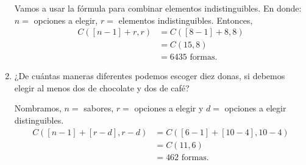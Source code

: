 \begin{enumerate}
\begin{center}
\begin{tikzpicture}[x=0.75pt,y=0.75pt,yscale=-1,xscale=1]
\end{tikzpicture}
    \end{center}
    \begin{solution}
    Vamos a usar la fórmula para combinar elementos indistinguibles. En donde: $n=$ opciones a elegir, $r=$ elementos indistinguibles. Entonces, 
    \begin{align*}
        C([n-1]+r,r) &= C([8-1]+8,8)\\
        &= C(15,8)\\
        &= 6435 \text{ formas.}
    \end{align*}
    \end{solution}
    \item ¿De cuántas maneras diferentes podemos escoger diez donas, si debemos elegir al menos dos de chocolate y dos de café?
    \begin{solution}
    Nombramos, $n=$ sabores, $r=$ opciones a elegir y $d=$ opciones a elegir distinguibles. 
    \begin{align*}
        C([n-1]+[r-d],r-d) &= C([6-1]+[10-4],10-4)\\
        &= C(11,6)\\
        &=  462 \text{ formas.}
    \end{align*}
    \end{solution}
\end{enumerate}
